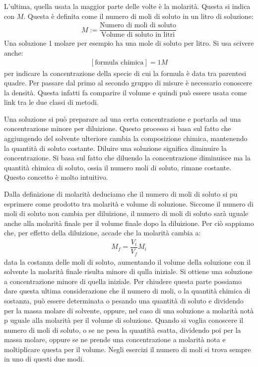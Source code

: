 \documentclass[../AppuntiChimica]{subfiles}
\begin{document}
	L'ultima, quella usata la maggior parte delle volte è la molarità. Questa si indica con $ M $. Questa è definita come il numero di moli di soluto in un litro di soluzione:
	\begin{gather}
	M:=\dfrac{\text{Numero di moli di soluto}}{\text{Volume di soluto in litri}}
	\end{gather}
	Una soluzione 1 molare per esempio ha una mole di soluto per litro. Si usa scivere anche:
	\begin{gather}
		\left[\text{formula chimica}\right]=1M
	\end{gather}
	per indicare la concentrazione della specie di cui la formula è data tra parentesi quadre. Per passare dal primo al secondo gruppo di misure è necessario conoscere la  densità. Questa infatti fa comparire il volume e quindi può essere usata come link tra le due classi di metodi. 
	
	Una soluzione si può preparare ad una certa concentrazione e portarla ad una concentrazione minore per diluizione. Questo processo si basa sul fatto che aggiungendo del solvente ulteriore cambia la composizione chimica, mantenendo la quantità di soluto costante. Diluire una soluzione significa diminuire la concentrazione. Si basa sul fatto che diluendo la concentrazione diminuisce ma la quantità chimica di soluto, ossia il numero moli di soluto, rimane costante. Questo concetto è molto intuitivo.
	
	Dalla definizione di molarità deduciamo che il numero di moli di soluto si pu esprimere come prodotto tra molarità e volume di soluzione. Siccome il numero di moli di soluto non cambia per diluizione, il numero di moli di soluto sarà uguale anche alla molarità finale per il volume finale dopo la diluizione. Per ciò sappiamo che, per effetto della diluizione, accade che la molarità cambia a:
	\begin{gather}
	\label{eqn:dilmol}
	M_{f}=\dfrac{V_{i}}{V_{f}}M_{i}
	\end{gather}
	data la costanza delle moli di soluto, aumentando il volume della soluzione con il solvente la molarità finale risulta minore di qulla iniziale. Si ottiene una soluzione a concentrazione minore di quella iniziale. Per chiudere questa parte possiamo dare questa ultima considerazione che il numero di moli, o la quantità chimica di sostanza, può essere determinata o pesando una quantità di soluto e dividendo per la massa molare di solvente, oppure, nel caso di una soluzione a molarità notà p uguale alla molarità per il volume di soluzione. Quando si voglia conoscere il numero di moli di soluto, o se ne pesa la quantità esatta, dividendo poi per la massa molare, oppure se ne prende una concentrazione a molarità nota e moltiplicare questa per il volume. Negli esercizi il numero di moli si trova sempre in uno di questi due modi. 
	
\end{document}
